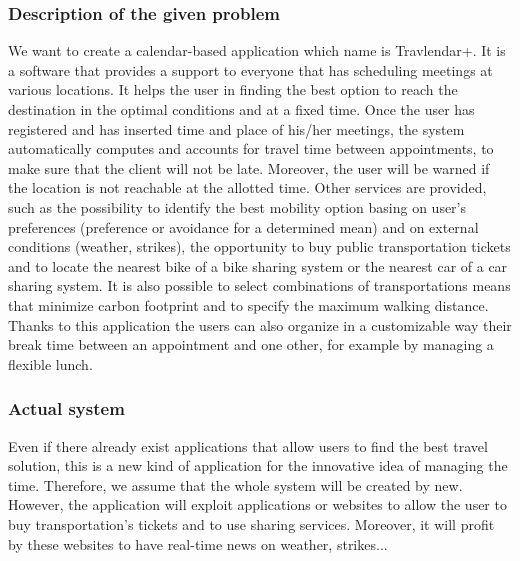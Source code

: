 \documentclass[12pt,titlepage]{article}
\begin{document}
\subsubsection{Description of the given problem}\label{RASD}
We want to create a calendar-based application which name is Travlendar+. It is a software that provides a support to everyone that has scheduling meetings at various locations. It helps the user in finding the best option to reach the destination in the optimal conditions and at a fixed time. 
Once the user has registered and has inserted time and place of his/her meetings, the system automatically computes and accounts for travel time between appointments, to make sure that the client will not be late. Moreover, the user will be warned if the location is not reachable at the allotted time. Other services are provided, such as the possibility to identify the best mobility option basing on user's preferences (preference or avoidance for a determined mean) and on external conditions (weather, strikes), the opportunity to buy public transportation tickets and to locate the nearest bike of a bike sharing system or the nearest car of a car sharing system. It is also possible to select combinations of transportations means that minimize carbon footprint and to specify the maximum walking distance.
Thanks to this application the users can also organize in a customizable way their break time between an appointment and one other, for example by managing a flexible lunch. 

\subsubsection{Actual system}\label{RASD}
Even if there already exist applications that allow users to find the best travel solution, this is a new kind of application for the innovative idea of managing the time. Therefore, we assume that the whole system will be created by new.
However, the application will exploit applications or websites to allow the user to buy transportation's tickets and to use sharing services. Moreover, it will profit by these websites to have real-time news on weather, strikes...
\end{document}

